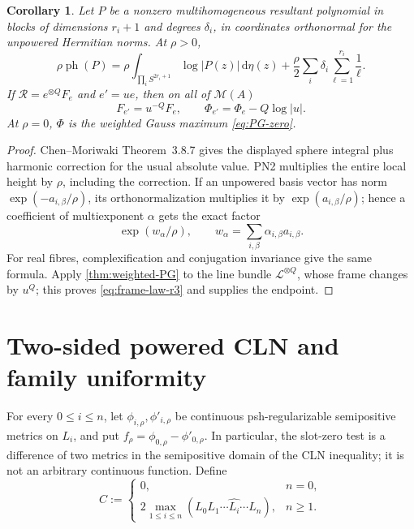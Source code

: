 \documentclass[11pt]{article}
\newtheorem{corollary}[theorem]{Corollary}
\newcommand{\ph}{\operatorname{ph}}
\newcommand{\cM}{\mathcal M}
\newcommand{\cR}{\mathcal R}
\newcommand{\abs}[1]{\lvert#1\rvert}
\begin{document}
\begin{corollary}
\label{cor:powered-PG}
Let $P$ be a nonzero multihomogeneous resultant polynomial in blocks of
dimensions $r_i+1$ and degrees $\delta_i$, in coordinates orthonormal for
the unpowered Hermitian norms.  At $\rho>0$,
\begin{equation}
 \rho\ph(P)=\rho\int_{\prod_iS^{2r_i+1}}
 \log\abs{P(z)}\,\mathrm d\eta(z)
 +\frac\rho2\sum_i\delta_i\sum_{\ell=1}^{r_i}\frac1\ell.
\tag{PH$_\rho$}\label{eq:powered-PH-r3}
\end{equation}
If $\cR=e^{\otimes Q}F_e$ and $e'=ue$, then on all of $\cM(A)$
\begin{equation}
 F_{e'}=u^{-Q}F_e,
 \qquad
 \Phi_{e'}=\Phi_e-Q\log\abs u.
\tag{FL}\label{eq:frame-law-r3}
\end{equation}
\smallskip
At $\rho=0$, $\Phi$ is the weighted Gauss maximum
\eqref{eq:PG-zero}.
\end{corollary}

\begin{proof}
Chen--Moriwaki Theorem~3.8.7 gives the displayed sphere integral plus harmonic
correction for the usual absolute value.  PN2 multiplies the entire local
height by $\rho$, including the correction.  If an unpowered basis vector
has norm $\exp(-a_{i,\beta}/\rho)$, its orthonormalization multiplies it by
$\exp(a_{i,\beta}/\rho)$; hence a coefficient of multiexponent $\alpha$
gets the exact factor
\[
 \exp(w_\alpha/\rho),\qquad
 w_\alpha=\sum_{i,\beta}\alpha_{i,\beta}a_{i,\beta}.
\]
For real fibres, complexification and conjugation invariance give the same
formula.  Apply \cref{thm:weighted-PG} to the line bundle
$\mathcal L^{\otimes Q}$, whose frame changes by $u^Q$; this proves
\eqref{eq:frame-law-r3} and supplies the endpoint.
\end{proof}

\section{Two-sided powered CLN and family uniformity}

For every $0\leq i\leq n$, let
$\phi_{i,\rho},\phi'_{i,\rho}$ be continuous psh-regularizable
semipositive metrics on $L_i$, and put
$f_\rho=\phi_{0,\rho}-\phi'_{0,\rho}$.  In particular, the slot-zero
test is a difference of two metrics in the semipositive domain of the CLN
inequality; it is not an arbitrary continuous function.  Define
\begin{equation}
 C:=
 \begin{cases}
 0,&n=0,\\[2mm]
 2\displaystyle\max_{1\leq i\leq n}
 (L_0L_1\cdots\widehat{L_i}\cdots L_n),&n\geq1.
 \end{cases}
\tag{4.1}\label{eq:CLN-C-r3}
\end{equation}
\end{document}
